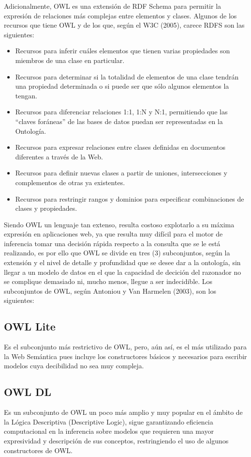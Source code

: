Adicionalmente, OWL es una extensión de RDF Schema para permitir la expresión de relaciones más complejas entre elementos y clases. Algunos de los recursos que tiene OWL y de los que, según el W3C (2005), carece RDFS son las siguientes:

\begin{itemize}
\item Recursos para inferir cuáles elementos que tienen varias propiedades son miembros de una clase en particular.
\item Recursos para determinar si la totalidad de elementos de una clase tendrán una propiedad determinada o si puede ser que sólo algunos elementos la tengan.
\item Recursos para diferenciar relaciones 1:1, 1:N y N:1, permitiendo que las ``claves foráneas'' de las bases de datos puedan ser representadas en la Ontología.
\item Recursos para expresar relaciones entre clases definidas en documentos diferentes a través de la Web.
\item Recursos para definir nuevas clases a partir de uniones, intersecciones y complementos de otras ya existentes.
\item Recursos para restringir rangos y dominios para especificar combinaciones de clases y propiedades.
\end{itemize}

Siendo OWL un lenguaje tan extenso, resulta costoso explotarlo a su máxima expresión en aplicaciones web, ya que resulta muy difícil para el motor de inferencia tomar una decisión rápida respecto a la consulta que se le está realizando, es por ello que OWL se divide en tres (3) subconjuntos, según la extensión y el nivel de detalle y profundidad que se desee dar a la ontología, sin llegar a un modelo de datos en el que la capacidad de decición del razonador no se complique demasiado ni, mucho menos, llegue a ser indecidible. Los subconjuntos de OWL, según Antoniou y Van Harmelen (2003), son los siguientes:

\subsection{OWL Lite}
Es el subconjunto más restrictivo de OWL, pero, aún así, es el más utilizado para la Web Semántica pues incluye los constructores básicos y necesarios para escribir modelos cuya decibilidad no sea muy compleja.

\subsection{OWL DL}
Es un subconjunto de OWL un poco más amplio y muy popular en el ámbito de la Lógica Descriptiva (Descriptive Logic), sigue garantizando eficiencia computacional en la inferencia sobre modelos que requieren una mayor expresividad y descripción de sus conceptos, restringiendo el uso de algunos constructores de OWL.


